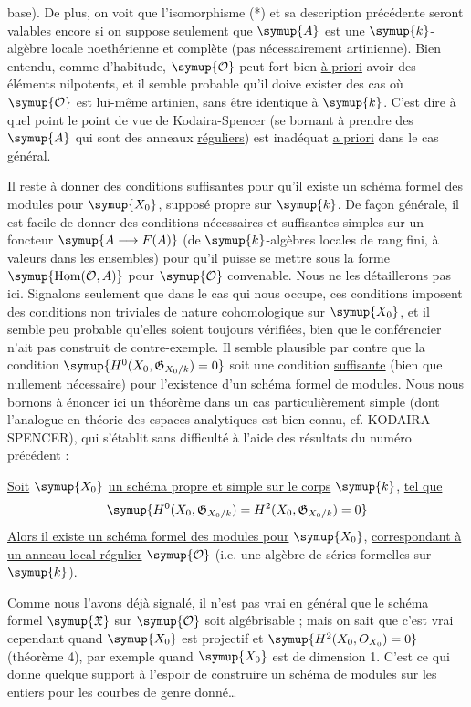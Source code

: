 base). De plus, on voit que l'isomorphisme (*) et sa description précédente
seront valables encore si on suppose seulement que $\symup{A}$ est une $\symup{k}$-algèbre
locale noethérienne et complète (pas nécessairement artinienne). Bien entendu,
comme d'habitude, $\symup{\mathcal O}$ peut fort bien \uline{à priori} avoir des
éléments nilpotents, et il semble probable qu'il doive exister des cas où
$\symup{\mathcal O}$ est lui-même artinien, sans être identique à $\symup{k}$. C'est dire à
quel point le point de vue de Kodaira-Spencer (se bornant à prendre des $\symup{A}$
qui sont des anneaux \uline{réguliers}) est inadéquat \uline{a priori} dans le cas
général.

Il reste à donner des conditions suffisantes pour qu'il existe un schéma formel
des modules pour $\symup{X_0}$, supposé propre sur $\symup{k}$. De façon générale, il est
facile de donner des conditions nécessaires et suffisantes simples sur un
foncteur $\symup{A\longrightarrow F(A)}$ (de $\symup{k}$-algèbres locales de rang fini, à valeurs
dans les ensembles) pour qu'il puisse se mettre sous la forme
$\symup{\operatorname{Hom}(\mathcal O,A)}$ pour $\symup{\mathcal O}$ convenable. Nous ne les
détaillerons pas ici. Signalons seulement que dans le cas qui nous occupe, ces
conditions imposent des conditions non triviales de nature cohomologique sur
$\symup{X_0}$, et il semble peu probable qu'elles soient toujours vérifiées, bien que
le conférencier n'ait pas construit de contre-exemple. Il semble plausible par
contre que la condition $\symup{H^0(X_0,\mathfrak G_{X_0/k})=0}$ soit une condition
\uline{suffisante} (bien que nullement nécessaire) pour l'existence d'un schéma formel
de modules. Nous nous bornons à énoncer ici un théorème dans un cas
particulièrement simple (dont l'analogue en théorie des espaces analytiques est
bien connu, cf. KODAIRA-SPENCER), qui s'établit sans difficulté à l'aide des
résultats du numéro précédent :

 \uline{Soit} $\symup{X_0}$ \uline{un schéma propre et simple sur le corps} $\symup{k}$,
\uline{tel que}
\[
  \symup{H^0(X_0,\mathfrak G_{X_0/k})=H^2(X_0,\mathfrak G_{X_0/k})=0}
\]
\uline{Alors il existe un schéma formel des modules pour} $\symup{X_0}$, \uline{correspondant à un
anneau local régulier} $\symup{\mathcal O}$ (i.e. une algèbre de séries formelles sur
$\symup{k}$).

Comme nous l'avons déjà signalé, il n'est pas vrai en général que le schéma
formel $\symup{\mathfrak X}$ sur $\symup{\mathcal O}$ soit algébrisable ; mais on sait que c'est
vrai cependant quand $\symup{X_0}$ est projectif et $\symup{H^2(X_0,O_{X_0})=0}$
(théorème 4), par exemple quand $\symup{X_0}$ est de dimension 1. C'est ce qui donne
quelque support à l'espoir de construire un schéma de modules sur les entiers
pour les courbes de genre donné\ldots{}

